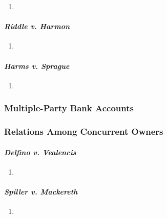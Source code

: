 \begin{enumerate}
    \item %
\end{enumerate}


\paragraph{\emph{Riddle v. Harmon}}

\begin{enumerate}
    \item %
\end{enumerate}

\paragraph{\emph{Harms v. Sprague}}

\begin{enumerate}
    \item %
\end{enumerate}

\subsubsection{Multiple-Party Bank Accounts}


\subsubsection{Relations Among Concurrent Owners}

\paragraph{\emph{Delfino v. Vealencis}}

\begin{enumerate}
    \item %
\end{enumerate}

\paragraph{\emph{Spiller v. Mackereth}}

\begin{enumerate}
    \item %
\end{enumerate}

